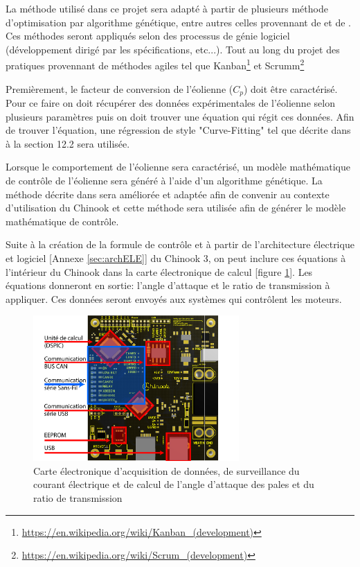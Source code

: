 \documentclass[11pt]{article}
\begin{document}
La méthode utilisé dans ce projet sera adapté à partir de plusieurs méthode d'optimisation par algorithme génétique, entre autres celles provennant de \cite{GeneticField} et de \cite{Ouissam12}. Ces méthodes seront appliqués selon des processus de génie logiciel (développement dirigé par les spécifications, etc...). Tout au long du projet des pratiques provennant de méthodes agiles tel que Kanban\footnote{\url{https://en.wikipedia.org/wiki/Kanban_(development)}} et Scrumm\footnote{\url{https://en.wikipedia.org/wiki/Scrum_(development)}} 

Premièrement, le facteur de conversion de l'éolienne ($C_p$) doit être caractérisé. Pour ce faire on doit récupérer des données expérimentales de l'éolienne selon plusieurs paramètres puis on doit trouver une équation qui régit ces données. Afin de trouver l'équation, une régression de style "Curve-Fitting" tel que décrite dans \cite{GeneticField} à la section 12.2 sera utilisée.

Lorsque le comportement de l'éolienne sera caractérisé, un modèle mathématique de contrôle de l'éolienne sera généré à l'aide d'un algorithme génétique. La méthode décrite dans \cite{Ouissam12} sera améliorée et adaptée afin de convenir au contexte d'utilisation du Chinook et cette méthode sera utilisée afin de générer le modèle mathématique de contrôle.

Suite à la création de la formule de contrôle et à partir de l'architecture électrique et logiciel [Annexe \ref{sec:archELE}] du Chinook 3, on peut inclure ces équations à l'intérieur du Chinook dans la carte électronique de calcul [figure \ref{fig:carteElec}]. Les équations donneront en sortie: l'angle d'attaque et le ratio de transmission à appliquer. Ces données seront envoyés aux systèmes qui contrôlent les moteurs.

\begin{figure}[H]
  \centering
  \includegraphics[width=0.7\textwidth]{images/3d-top-annoté.pdf}
  \caption[Carte électronique de calcul]{Carte électronique d'acquisition de données, de surveillance du courant électrique et de calcul de l'angle d'attaque des pales et du ratio de transmission}
  \label{fig:carteElec}
\end{figure}
\end{document}
